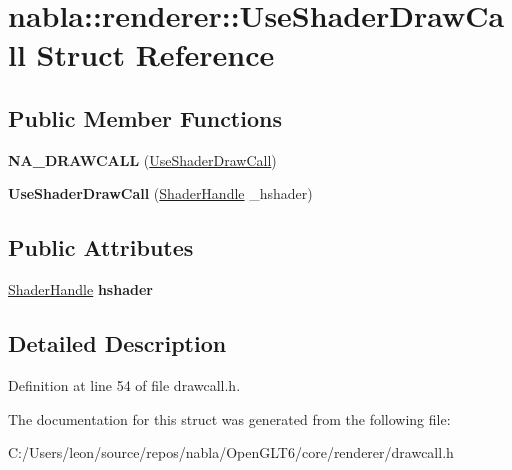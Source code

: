\hypertarget{structnabla_1_1renderer_1_1_use_shader_draw_call}{}\section{nabla\+::renderer\+::Use\+Shader\+Draw\+Call Struct Reference}
\label{structnabla_1_1renderer_1_1_use_shader_draw_call}
\subsection*{Public Member Functions}
\begin{DoxyCompactItemize}
\item 
\mbox{\label{structnabla_1_1renderer_1_1_use_shader_draw_call_a4cff7dca978fc780f641c35f44f0437e}} 
{\bfseries N\+A\+\_\+\+D\+R\+A\+W\+C\+A\+LL} (\mbox{\hyperlink{structnabla_1_1renderer_1_1_use_shader_draw_call}{Use\+Shader\+Draw\+Call}})
\item 
\mbox{\label{structnabla_1_1renderer_1_1_use_shader_draw_call_a73f22c8895e35dcda3f28300292bfa23}} 
{\bfseries Use\+Shader\+Draw\+Call} (\mbox{\hyperlink{classnabla_1_1renderer_1_1_handle}{Shader\+Handle}} \+\_\+hshader)
\end{DoxyCompactItemize}
\subsection*{Public Attributes}
\begin{DoxyCompactItemize}
\item 
\mbox{\label{structnabla_1_1renderer_1_1_use_shader_draw_call_ac6234e750c14de7bb0e2b48d0740e332}} 
\mbox{\hyperlink{classnabla_1_1renderer_1_1_handle}{Shader\+Handle}} {\bfseries hshader}
\end{DoxyCompactItemize}


\subsection{Detailed Description}


Definition at line 54 of file drawcall.\+h.



The documentation for this struct was generated from the following file\+:\begin{DoxyCompactItemize}
\item 
C\+:/\+Users/leon/source/repos/nabla/\+Open\+G\+L\+T6/core/renderer/drawcall.\+h\end{DoxyCompactItemize}
